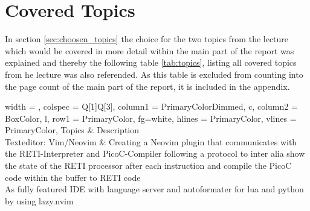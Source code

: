 \documentclass{report}
\begin{document}

\newpage
\section{Covered Topics}

In section \ref{sec:choosen_topics} the choice for the two topics from the lecture which would be covered in more detail within the main part of the report was explained and thereby the following table \ref{tab:topics}, listing all covered topics from he lecture was also referended. As this table is excluded from counting into the page count of the main part of the report, it is included in the appendix.

\begin{table}[H]
	\centering
	\begin{tblr}{
		width = \linewidth,
		colspec = {Q[1]Q[3]},
		column{1} = {PrimaryColorDimmed, c},
		column{2} = {BoxColor, l},
		row{1} = {PrimaryColor, fg=white},
		hlines = {PrimaryColor},
		vlines = {PrimaryColor},
		}
		Topics                 & Description                                                                                                                                                                                                                                                                                          \\
		Texteditor: Vim/Neovim & {\hspace{\dimexpr\labelsep+0.5\tabcolsep}Creating a Neovim plugin that communicates with the RETI-Interpreter and PicoC-Compiler following a protocol to inter alia show the state of the RETI processor after each instruction and compile the PicoC code within the buffer to RETI code \\\hspace{\dimexpr\labelsep+0.5\tabcolsep}As fully featured IDE with language server and autoformater for lua and python by using lazy.nvim} \\

\end{tblr}
\end{table}
\end{document}
